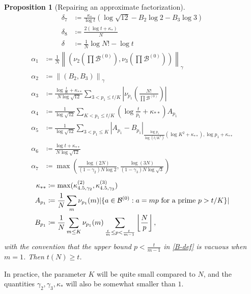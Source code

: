 \documentclass[10pt,a4paper,reqno]{amsart}
\numberwithin{equation}{section}
\theoremstyle{plain}
\newtheorem{proposition}[theorem]{Proposition}
\theoremstyle{definition}
\newcommand\tuple{{\mathcal B}}
\begin{document}
\begin{proposition}[Repairing an approximate factorization]
\begin{align}
\delta_7 &\coloneqq \frac{\kappa_*}{\log t} \left( \log \sqrt{12} - B_2 \log 2 - B_3 \log 3\right)\label{delta7-def}  \\
\delta_8 &\coloneqq \frac{2(\log t + \kappa_*)}{N} \label{delta8-def}\\
\delta &\coloneqq \frac{1}{N} \log N! - \log t\label{delta-def}  
\end{align}
\begin{align}
\alpha_1 &\coloneqq \frac{1}{N} \left\| \left( \nu_{2}\left(\prod \tuple^{(0)}\right), \nu_{3}\left(\prod \tuple^{(0)}\right)\right) \right\|_\gamma \label{alpha1-def}  \\
\alpha_2 &\coloneqq \left\| (B_2, B_3) \right\|_\gamma \label{alpha2-def}  \\
\alpha_3 &\coloneqq \frac{\log \frac{t}{K} + \kappa_{**}}{N\log \sqrt{12}} \sum_{3 < p_1 \leq t/K} \left|\nu_{p_1}\left( \frac{N!}{\prod \tuple^{(0)}} \right)\right| \label{alpha3-def}  \\
\alpha_4 &\coloneqq \frac{1}{\log \sqrt{12}} \sum_{K < p_1 \leq t/K} \left(\log \frac{t}{p_1} + \kappa_{**}\right) A_{p_1} \label{alpha4-def}  \\
\alpha_5 &\coloneqq \frac{1}{\log \sqrt{12}} \sum_{3 < p_1 \leq K} \left|A_{p_1} - B_{p_1}\right|_{\frac{\log p_1}{\log(t/K^2)} (\log K^2 + \kappa_{**}), \log p_1 + \kappa_{**}} \label{alpha5-def}  \\
\alpha_6 &\coloneqq \frac{\log t + \kappa_{**}}{N\log \sqrt{12}}  \label{alpha6-def}  \\
\alpha_7 &\coloneqq \max\left( \frac{\log(2N)}{(1-\gamma_2)N\log 2},  \frac{\log(3N)}{(1-\gamma_3)N\log \sqrt{3}}\right)\label{alpha7-def}  
\end{align}
\begin{align}
\kappa_{**} &\coloneqq \max(\kappa^{(2)}_{4.5, \gamma_2}, \kappa^{(3)}_{4.5, \gamma_3}) \label{kappastar-def}  \\
A_{p_1} &\coloneqq \frac{1}{N} \sum_m \nu_{p_1}(m) | \{ a \in \tuple^{(0)}: a = mp \hbox{ for a prime } p > t/K \}| \label{A-def} \\
B_{p_1} &\coloneqq \frac{1}{N} \sum_{m \leq K} \nu_{p_1}(m) \sum_{\frac{t}{m} \leq p < \frac{t}{m-1}} \left \lfloor \frac{N}{p} \right\rfloor,\label{B-def} 
\end{align}
with the convention that the upper bound $p < \frac{t}{m-1}$ in \eqref{B-def} is vacuous when $m=1$.  Then $t(N) \geq t$.
\end{proposition}

In practice, the parameter $K$ will be quite small compared to $N$, and the quantities $\gamma_2, \gamma_3, \kappa_{*}$ will also be somewhat smaller than $1$.
\end{document}
